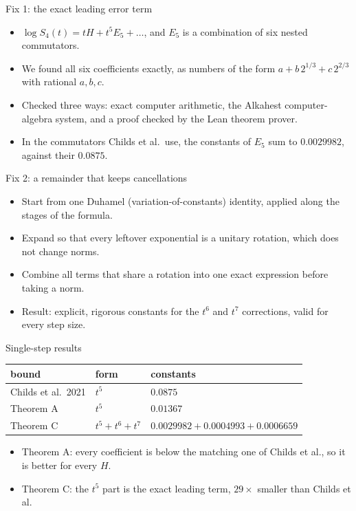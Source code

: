 \documentclass[11pt,aspectratio=169]{beamer}
\begin{document}
\begin{frame}{Fix 1: the exact leading error term}
\begin{itemize}[<+->]
\item $\log S_4(t)=tH+t^5E_5+\dots$, and $E_5$ is a combination of six nested commutators.
\item We found all six coefficients exactly, as numbers of the form $a+b\,2^{1/3}+c\,2^{2/3}$ with rational $a,b,c$.
\item Checked three ways: exact computer arithmetic, the Alkahest computer-algebra system, and a proof checked by the Lean theorem prover.
\item In the commutators Childs et al.\ use, the constants of $E_5$ sum to $0.0029982$, against their $0.0875$.
\end{itemize}
\end{frame}

\begin{frame}{Fix 2: a remainder that keeps cancellations}
\begin{itemize}[<+->]
\item Start from one Duhamel (variation-of-constants) identity, applied along the stages of the formula.
\item Expand so that every leftover exponential is a unitary rotation, which does not change norms.
\item Combine all terms that share a rotation into one exact expression before taking a norm.
\item Result: explicit, rigorous constants for the $t^6$ and $t^7$ corrections, valid for every step size.
\end{itemize}
\end{frame}

\begin{frame}{Single-step results}
\begin{center}
\begin{tabular}{@{}lll@{}}
\toprule
bound & form & constants\\
\midrule
Childs et al.\ 2021 & $t^5$ & $0.0875$\\
\pause Theorem A & $t^5$ & $0.01367$\\
\pause Theorem C & $t^5+t^6+t^7$ & $0.0029982+0.0004993+0.0006659$\\
\bottomrule
\end{tabular}
\end{center}
\begin{itemize}[<+->]
\item Theorem A: every coefficient is below the matching one of Childs et al., so it is better for every $H$.
\item Theorem C: the $t^5$ part is the exact leading term, $29\times$ smaller than Childs et al.
\end{itemize}
\end{frame}
\end{document}
